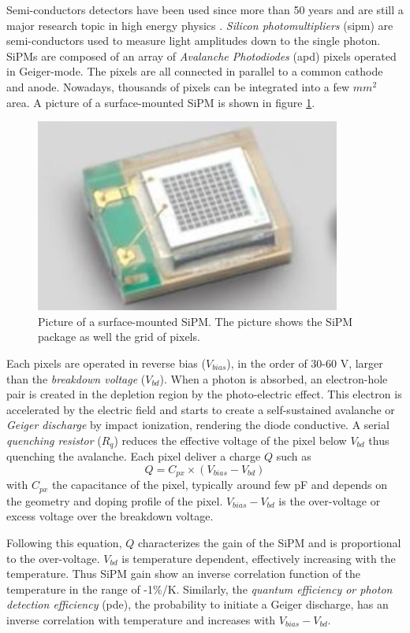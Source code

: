Semi-conductors detectors have been used since more than 50 years and are still a major research topic in high energy physics \cite{1748-0221-4-04-P04004, Garutti:2011qv, Garutti:2017ipx}. \textit{Silicon photomultipliers} (\acrshort{sipm}) are semi-conductors used to measure light amplitudes down to the single photon. SiPMs are composed of an array of \textit{Avalanche Photodiodes} (\acrshort{apd}) pixels operated in Geiger-mode. The pixels are all connected in parallel to a common cathode and anode. Nowadays, thousands of pixels can be integrated into a few $mm^2$ area. A picture of a surface-mounted SiPM is shown in figure \ref{fig:SMD_SiPM}.

\begin{figure}[htbp!]
  \centering
  \includegraphics[width=0.4\linewidth]{chap3/fig/SMD_SiPM.png}
  \caption{Picture of a surface-mounted SiPM. The picture shows the SiPM package as well the grid of pixels.} \label{fig:SMD_SiPM}
\end{figure}

Each pixels are operated in reverse bias ($V_{bias}$), in the order of 30-60 V, larger than the \textit{breakdown voltage} ($V_{bd}$). When a photon is absorbed, an electron-hole pair is created in the depletion region by the photo-electric effect. This electron is accelerated by the electric field and starts to create a self-sustained avalanche or \textit{Geiger discharge} by impact ionization, rendering the diode conductive. A serial \textit{quenching resistor} ($R_q$) reduces the effective voltage of the pixel below $V_{bd}$ thus quenching the avalanche. Each pixel deliver a charge $Q$ such as
\begin{equation}
  Q = C_{px} \times (V_{bias} - V_{bd})
\end{equation}
with $C_{px}$ the capacitance of the pixel, typically around few pF and depends on the geometry and doping profile of the pixel. $V_{bias} - V_{bd}$ is the over-voltage or excess voltage over the breakdown voltage.

Following this equation, $Q$ characterizes the gain of the SiPM and is proportional to the over-voltage. $V_{bd}$ is temperature dependent, effectively increasing with the temperature. Thus SiPM gain show an inverse correlation function of the temperature in the range of -1\%/K. Similarly, the \textit{quantum efficiency or photon detection efficiency} (\acrshort{pde}), the probability to initiate a Geiger discharge, has an inverse correlation with temperature and increases with $V_{bias} - V_{bd}$.

